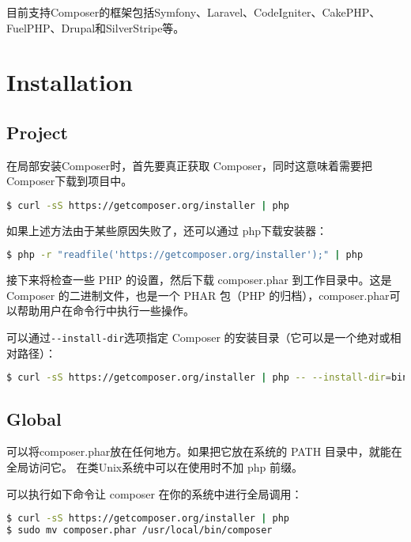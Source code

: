 目前支持Composer的框架包括Symfony、Laravel、CodeIgniter、CakePHP、FuelPHP、Drupal和SilverStripe等。

\section{Installation}

\subsection{Project}

在局部安装Composer时，首先要真正获取 Composer，同时这意味着需要把Composer下载到项目中。

\begin{lstlisting}[language=bash]
$ curl -sS https://getcomposer.org/installer | php
\end{lstlisting}

如果上述方法由于某些原因失败了，还可以通过 php下载安装器：

\begin{lstlisting}[language=bash]
$ php -r "readfile('https://getcomposer.org/installer');" | php
\end{lstlisting}

接下来将检查一些 PHP 的设置，然后下载 composer.phar 到工作目录中。这是 Composer 的二进制文件，也是一个 PHAR 包（PHP 的归档），composer.phar可以帮助用户在命令行中执行一些操作。

可以通过\texttt{-\/-install-dir}选项指定 Composer 的安装目录（它可以是一个绝对或相对路径）：

\begin{lstlisting}[language=bash]
$ curl -sS https://getcomposer.org/installer | php -- --install-dir=bin
\end{lstlisting}

\subsection{Global}

可以将composer.phar放在任何地方。如果把它放在系统的 PATH 目录中，就能在全局访问它。 在类Unix系统中可以在使用时不加 php 前缀。

可以执行如下命令让 composer 在你的系统中进行全局调用：

\begin{lstlisting}[language=bash]
$ curl -sS https://getcomposer.org/installer | php
$ sudo mv composer.phar /usr/local/bin/composer
\end{lstlisting}

